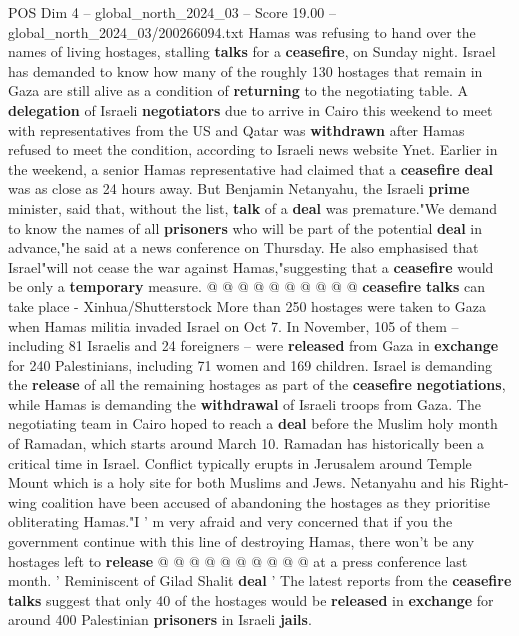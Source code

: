 \begin{textsample}{POS Dim 4 – global\_north\_2024\_03 – Score 19.00 – global\_north\_2024\_03/200266094.txt}  \label{ex:f4_pos_245}
Hamas was refusing to hand over the names of living hostages, stalling \textbf{talks} for a \textbf{ceasefire}, on Sunday night.
Israel has demanded to know how many of the roughly 130 hostages that remain in Gaza are still alive as a condition of \textbf{returning} to the negotiating table.
A \textbf{delegation} of Israeli \textbf{negotiators} due to arrive in Cairo this weekend to meet with representatives from the US and Qatar was \textbf{withdrawn} after Hamas refused to meet the condition, according to Israeli news website Ynet.
Earlier in the weekend, a senior Hamas representative had claimed that a \textbf{ceasefire} \textbf{deal} was as close as 24 hours away.
But Benjamin Netanyahu, the Israeli \textbf{prime} minister, said that, without the list, \textbf{talk} of a \textbf{deal} was premature."We demand to know the names of all \textbf{prisoners} who will be part of the potential \textbf{deal} in advance,"he said at a news conference on Thursday.
He also emphasised that Israel"will not cease the war against Hamas,"suggesting that a \textbf{ceasefire} would be only a \textbf{temporary} measure. @ @ @ @ @ @ @ @ @ @ \textbf{ceasefire} \textbf{talks} can take place - Xinhua/Shutterstock More than 250 hostages were taken to Gaza when Hamas militia invaded Israel on Oct 7.
In November, 105 of them -- including 81 Israelis and 24 foreigners -- were \textbf{released} from Gaza in \textbf{exchange} for 240 Palestinians, including 71 women and 169 children.
Israel is demanding the \textbf{release} of all the remaining hostages as part of the \textbf{ceasefire} \textbf{negotiations}, while Hamas is demanding the \textbf{withdrawal} of Israeli troops from Gaza.
The negotiating team in Cairo hoped to reach a \textbf{deal} before the Muslim holy month of Ramadan, which starts around March 10.
Ramadan has historically been a critical time in Israel.
Conflict typically erupts in Jerusalem around Temple Mount which is a holy site for both Muslims and Jews.
Netanyahu and his Right-wing coalition have been accused of abandoning the hostages as they prioritise obliterating Hamas."I ' m very afraid and very concerned that if you the government continue with this line of destroying Hamas, there won't be any hostages left to \textbf{release} @ @ @ @ @ @ @ @ @ @ at a press conference last month. ' Reminiscent of Gilad Shalit \textbf{deal} ' The latest reports from the \textbf{ceasefire} \textbf{talks} suggest that only 40 of the hostages would be \textbf{released} in \textbf{exchange} for around 400 Palestinian \textbf{prisoners} in Israeli \textbf{jails}.

\end{textsample}
